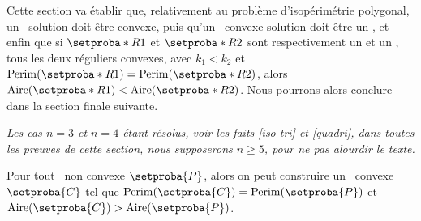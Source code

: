 Cette section va établir que, relativement au problème d'isopérimétrie polygonal,
un \ngone\ solution doit être convexe, 
puis
qu'un \ngone\ convexe solution doit être un \nreg,
et enfin
que si $\setproba*{R}{1}$ et $\setproba*{R}{2}$ sont respectivement un  et un , tous les deux réguliers convexes, avec 
$k_1 < k_2$ et $\perim{\setproba*{R}{1}} = \perim{\setproba*{R}{2}}$, 
alors
$\area{\setproba*{R}{1}} < \area{\setproba*{R}{2}}$.
Nous pourrons alors conclure dans la section finale suivante.


\begin{tcolorbox}
	\itshape\small
	Les cas $n = 3$ et $n = 4$ étant résolus, voir les faits \ref{iso-tri} et \ref{quadri}, dans toutes les preuves de cette section, nous supposerons $n \geq 5$, pour ne pas alourdir le texte.
\end{tcolorbox}




\begin{fact} \label{must-be-conv}
    Pour tout \ngone\ non convexe $\setproba{P}$,
	alors on peut construire un \ngone\ convexe $\setproba{C}$ tel que
	$\perim{\setproba{C}} = \perim{\setproba{P}}$
	et
	$\area{\setproba{C}} > \area{\setproba{P}}$.
\end{fact}


